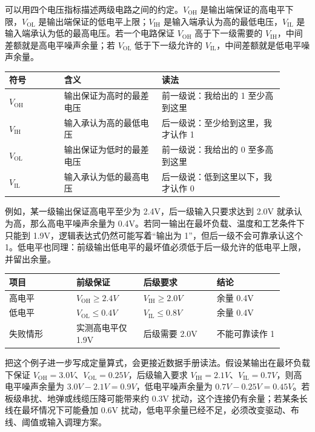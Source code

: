 可以用四个电压指标描述两级电路之间的约定。$V_\mathrm{OH}$ 是输出端保证的高电平下限，$V_\mathrm{OL}$ 是输出端保证的低电平上限；$V_\mathrm{IH}$ 是输入端承认为高的最低电压，$V_\mathrm{IL}$ 是输入端承认为低的最高电压。若一个电路保证 $V_\mathrm{OH}$ 高于下一级需要的 $V_\mathrm{IH}$，中间差额就是高电平噪声余量；若 $V_\mathrm{OL}$ 低于下一级允许的 $V_\mathrm{IL}$，中间差额就是低电平噪声余量。

\begin{longtable}{L{0.18\linewidth}L{0.32\linewidth}L{0.4\linewidth}}
\toprule
符号 & 含义 & 读法 \\
\midrule
$V_\mathrm{OH}$ & 输出保证为高时的最差电压 & 前一级说：我给出的 1 至少高到这里 \\\tablerowrule
$V_\mathrm{IH}$ & 输入承认为高的最低电压 & 后一级说：至少给到这里，我才认作 1 \\\tablerowrule
$V_\mathrm{OL}$ & 输出保证为低时的最差电压 & 前一级说：我给出的 0 至多高到这里 \\\tablerowrule
$V_\mathrm{IL}$ & 输入承认为低的最高电压 & 后一级说：低到这里以下，我才认作 0 \\
\bottomrule
\end{longtable}

例如，某一级输出保证高电平至少为 2.4V，后一级输入只要求达到 2.0V 就承认为高，那么高电平噪声余量为 0.4V。若同一输出在最坏负载、温度和工艺条件下只能到 1.9V，逻辑表达式仍然可能写着“输出为 1”，但后一级不会可靠承认这个 1。低电平也同理：前级输出低电平的最坏值必须低于后一级允许的低电平上限，并留出余量。

\begin{longtable}{L{0.22\linewidth}L{0.22\linewidth}L{0.24\linewidth}L{0.22\linewidth}}
\toprule
项目 & 前级保证 & 后级要求 & 结论 \\
\midrule
高电平 & $V_\mathrm{OH} \ge 2.4V$ & $V_\mathrm{IH} \ge 2.0V$ & 余量 0.4V \\\tablerowrule
低电平 & $V_\mathrm{OL} \le 0.4V$ & $V_\mathrm{IL} \le 0.8V$ & 余量 0.4V \\\tablerowrule
失败情形 & 实测高电平仅 1.9V & 后级需要 2.0V & 不能可靠读作 1 \\
\bottomrule
\end{longtable}

把这个例子进一步写成定量算式，会更接近数据手册读法。假设某输出在最坏负载下保证 $V_\mathrm{OH}=3.0V$、$V_\mathrm{OL}=0.25V$，后级输入要求 $V_\mathrm{IH}=2.1V$、$V_\mathrm{IL}=0.7V$，则高电平噪声余量为 $3.0V-2.1V=0.9V$，低电平噪声余量为 $0.7V-0.25V=0.45V$。若板级串扰、地弹或线缆压降可能带来约 0.3V 扰动，这个连接仍有余量；若某条长线在最坏情况下可能叠加 0.6V 扰动，低电平余量已经不足，必须改变驱动、布线、阈值或输入调理方案。

